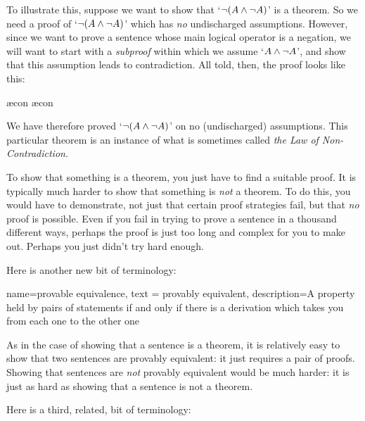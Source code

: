 To illustrate this, suppose we want to show that `$\neg (A \wedge \neg A)$' is a theorem.  So we need a proof of `$\neg(A \wedge \neg A)$' which has \emph{no} undischarged assumptions. However, since we want to prove a sentence whose main logical operator is a negation, we will want to start with a \emph{subproof} within which we assume `$A \wedge \neg A$', and show that this assumption leads to contradiction. All told, then, the proof looks like this:
	\begin{fitchproof}
		\open
			\ae{con}
			\ae{con}
		\close
	\end{fitchproof}
We have therefore proved `$\neg (A \wedge \neg A)$' on no (undischarged) assumptions. This particular theorem is an instance of what is sometimes called \emph{the Law of Non-Contradiction}.

To show that something is a theorem, you just have to find a suitable proof. It is typically much harder to show that something is \emph{not} a theorem. To do this, you would have to demonstrate, not just that certain proof strategies fail, but that \emph{no} proof is possible. Even if you fail in trying to prove a sentence in a thousand different ways, perhaps the proof is just too long and complex for you to make out. Perhaps you just didn't try hard enough.

Here is another new bit of terminology:
        
{
  name=provable equivalence,
  text = provably equivalent,
description={A property held by pairs of statements if and only if there is a derivation which takes you from each one to the other one}
}


As in the case of showing that a sentence is a theorem, it is relatively easy to show that two sentences are provably equivalent: it just requires a pair of proofs. Showing that sentences are \emph{not} provably equivalent would be much harder: it is just as hard as showing that a sentence is not a theorem. 

Here is a third, related, bit of terminology:
        

